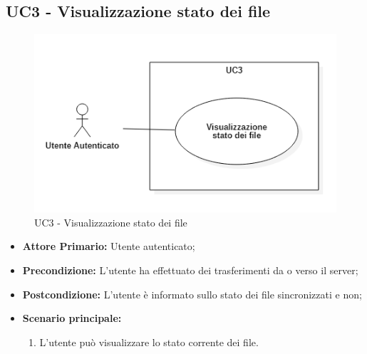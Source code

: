 \subsection{UC3 - Visualizzazione stato dei file}
\begin{figure}[H]
    \centering
    \includegraphics[scale = 0.8]{components/img/UC3.png}
    \caption{UC3 - Visualizzazione stato dei file}
\end{figure}
\begin{itemize}
\item \textbf{Attore Primario:} Utente autenticato;
\item \textbf{Precondizione:} L'utente ha effettuato dei trasferimenti da o verso il server;
\item \textbf{Postcondizione:} L'utente è informato sullo stato dei file sincronizzati e non;
\item \textbf{Scenario principale:}
    \begin{enumerate}
    \item L'utente può visualizzare lo stato corrente dei file.
    \end{enumerate}
\end{itemize}